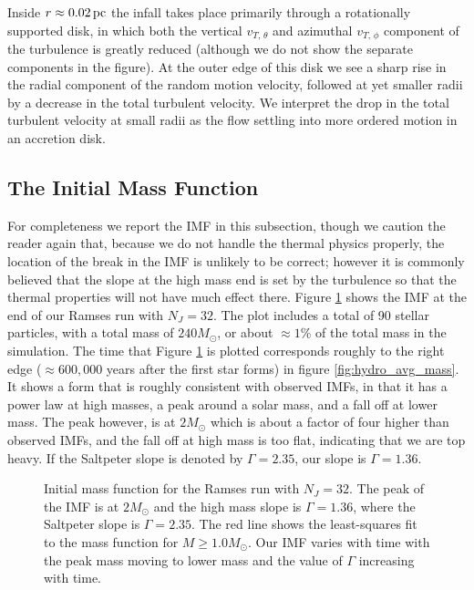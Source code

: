 \documentclass[../dissertation.tex]{subfiles}
\begin{document}
Inside $r\approx 0.02\,\rm pc$ the infall takes place primarily through a rotationally 
supported disk, in which both the vertical $v_{T,\, \theta}$ and 
azimuthal $v_{T,\, \phi}$ component of the turbulence is greatly reduced 
(although we do not show the separate components in the figure). At the 
outer edge of this 
disk we see a sharp rise in the radial component of the random motion velocity, 
followed at yet smaller radii by a decrease in the total turbulent velocity. 
We interpret the drop in the total turbulent
velocity at small radii as the flow settling into more ordered motion in an accretion disk.

\subsection{The Initial Mass Function}

For completeness we report the IMF in this subsection, though we caution the reader again that, because we do not handle the thermal physics properly, the location of the break in the IMF is unlikely to be correct; however it is commonly believed that the slope at the high mass end is set by the turbulence so that the thermal properties will not have much effect there.
Figure \ref{fig:hydro_imf} shows the IMF at the end of our Ramses run with $N_J = 32$. 
The plot includes a total of 90 stellar particles, with a total mass of $240 M_\odot$, or about  $\approx 1 \%$ of the total mass in the simulation. The time that Figure \ref{fig:hydro_imf} is plotted corresponds roughly to the right edge ($\approx 600,000$ years after the first star forms) in figure \ref{fig:hydro_avg_mass}. 
It shows a form that is roughly consistent with observed IMFs, in that it has a power law at high masses, a peak around a solar mass, and a fall off at lower mass. The peak however, is at $2 M_\odot$ which is about a factor of four higher than observed IMFs, and the fall off at high mass is too flat, indicating that we are top heavy. If the Saltpeter slope is denoted by $\Gamma = 2.35$, our slope is $\Gamma = 1.36$. 

\begin{figure}[htb]
\caption[Hydro Initial Mass Function]{Initial mass function for the Ramses run with $N_J = 32$. The peak of the IMF is at $2 M_\odot$ and the high mass slope is $\Gamma = 1.36$, where the Saltpeter slope is $\Gamma = 2.35$. The red line shows the least-squares fit to the mass function for $M \geq 1.0 M_\odot$. Our IMF varies with time with the peak mass moving to lower mass and the value of $\Gamma$ increasing with time. \label{fig:hydro_imf}}
\end{figure}
\end{document}
